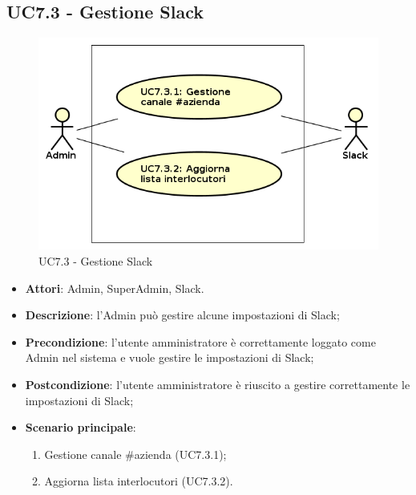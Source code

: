 \documentclass[../AnalisiDeiRequisiti_v4.0.0.tex]{subfiles}
\begin{document}
\subsection{UC7.3 - Gestione Slack} 
\label{sssec:UC7.3} 
\begin{figure}[!h]
	\centering
	\includegraphics[width=\textwidth]{UseCases/UC7_GestionePannelloAdmin/UC7_3_GestioneSlack/UC7_3_GestioneSlack.png}
	\caption{UC7.3 - Gestione Slack}
\end{figure}
\begin{itemize} 
\item \textbf{Attori}: Admin, SuperAdmin, Slack.
\item \textbf{Descrizione}: l'Admin può gestire alcune impostazioni di Slack;
\item \textbf{Precondizione}: l'utente amministratore è correttamente loggato come Admin nel sistema e vuole gestire le impostazioni di Slack;
\item \textbf{Postcondizione}: l'utente amministratore è riuscito a gestire correttamente le impostazioni di Slack;
\item \textbf{Scenario principale}: \begin{enumerate}\item Gestione canale \#azienda (UC7.3.1);\item Aggiorna lista interlocutori (UC7.3.2). 
\end{enumerate}
\end{itemize} 
\end{document}
